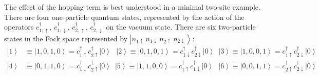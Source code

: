 The effect of the hopping term is best understood in a minimal two-site example.
There are four one-particle quantum states, represented by the action of the operators $c_{1,\uparrow}^\dagger$, $c_{1,\downarrow}^\dagger$, $c_{2,\uparrow}^\dagger$, $c_{2,\downarrow}^\dagger$ on the vacuum state.
There are six two-particle states in the Fock space represented by $\left| n_{1\uparrow} \,  n_{1\downarrow} \,  n_{2\uparrow} \, n_{2\downarrow} \right\rangle$:
\begin{equation}
\begin{split}
\left| 1 \right\rangle &\equiv \left| 1, 0, 1, 0 \right\rangle = c_{1\uparrow}^\dagger c_{2\uparrow}^\dagger \left| 0 \right\rangle \,\,\,\,
\left| 2 \right\rangle \equiv \left| 0, 1, 0, 1 \right\rangle = c_{1\downarrow}^\dagger c_{2\downarrow}^\dagger \left| 0 \right\rangle
\,\,\,
\left| 3 \right\rangle \equiv \left| 1, 0, 0, 1 \right\rangle = c_{1\uparrow}^\dagger c_{2\downarrow}^\dagger \left| 0 \right\rangle \\
\left| 4 \right\rangle &\equiv \left| 0, 1, 1, 0 \right\rangle = c_{1\downarrow}^\dagger c_{2\uparrow}^\dagger \left| 0 \right\rangle
\,\,\,
\left| 5 \right\rangle \equiv \left| 1, 1, 0, 0 \right\rangle = c_{1\uparrow}^\dagger c_{1\downarrow}^\dagger \left| 0 \right\rangle \,\,\,\,
\left| 6 \right\rangle \equiv \left| 0, 0, 1, 1 \right\rangle = c_{2\uparrow}^\dagger c_{2\downarrow}^\dagger \left| 0 \right\rangle \\
\end{split}
\end{equation}

